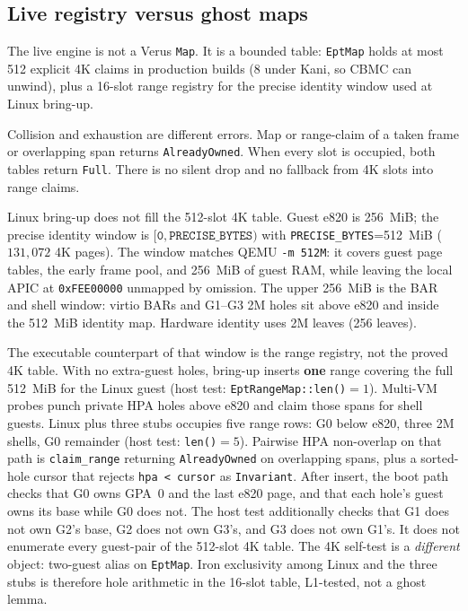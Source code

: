 \documentclass[sigplan,10pt,anonymous]{acmart}
\begin{document}
\subsection{Live registry versus ghost maps}
\label{sec:honest}

The live engine is not a Verus \texttt{Map}. It is a bounded table:
\texttt{EptMap} holds at most 512 explicit 4K claims in production builds
(8 under Kani, so CBMC can unwind), plus a 16-slot range registry for the
precise identity window used at Linux bring-up.

Collision and exhaustion are different errors. Map or range-claim of a
taken frame or overlapping span returns \texttt{AlreadyOwned}. When every
slot is occupied, both tables return \texttt{Full}. There is no silent
drop and no fallback from 4K slots into range claims.

Linux bring-up does not fill the 512-slot 4K table. Guest e820 is 256~MiB;
the precise identity window is $[\texttt{0},\texttt{PRECISE\_BYTES})$ with
\texttt{PRECISE\_BYTES}=512~MiB ($131{,}072$ 4K pages). The window matches
QEMU \texttt{-m 512M}: it covers guest page tables, the early frame pool,
and 256~MiB of guest RAM, while leaving the local APIC at
\texttt{0xFEE00000} unmapped by omission. The upper 256~MiB is the BAR and
shell window: virtio BARs and G1--G3 2M holes sit above e820 and inside the
512~MiB identity map. Hardware identity uses 2M leaves (256 leaves).

The executable counterpart of that window is the range registry, not the
proved 4K table. With no extra-guest holes, bring-up inserts \textbf{one}
range covering the full 512~MiB for the Linux guest (host test:
\texttt{EptRangeMap::len()}${}=1$). Multi-VM probes punch private HPA holes
above e820 and claim those spans for shell guests. Linux plus three stubs
occupies five range rows: G0 below e820, three 2M shells, G0 remainder
(host test: \texttt{len()}${=}5$). Pairwise HPA non-overlap on that path is
\texttt{claim\_range} returning \texttt{AlreadyOwned} on overlapping
spans, plus a sorted-hole cursor that rejects \texttt{hpa < cursor} as
\texttt{Invariant}. After insert, the boot path checks that G0 owns GPA~0
and the last e820 page, and that each hole's guest owns its base while G0
does not. The host test additionally checks that G1 does not own G2's base,
G2 does not own G3's, and G3 does not own G1's. It does not enumerate every
guest-pair of the 512-slot 4K table. The 4K self-test is a \emph{different}
object: two-guest alias on \texttt{EptMap}. Iron exclusivity among Linux
and the three stubs is therefore hole arithmetic in the 16-slot table,
L1-tested, not a ghost lemma.
\end{document}

